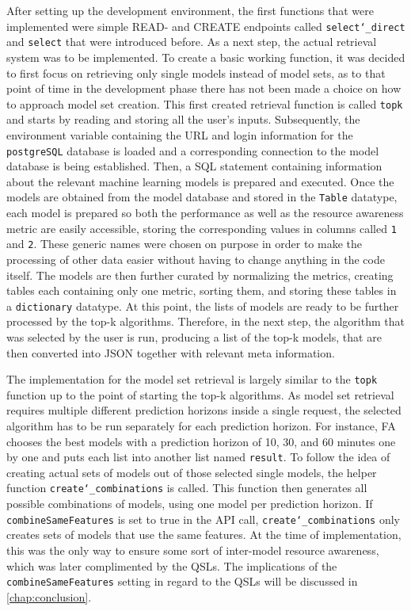 After setting up the development environment, the first functions that were implemented were simple READ- and CREATE endpoints called \texttt{select\char`_direct} and \texttt{select} that were introduced before. As a next step, the actual retrieval system was to be implemented. To create a basic working function, it was decided to first focus on retrieving only single models instead of model sets, as to that point of time in the development phase there has not been made a choice on how to approach model set creation. This first created retrieval function is called \texttt{topk} and starts by reading and storing all the user’s inputs. Subsequently, the environment variable containing the URL and login information for the \texttt{postgreSQL} database is loaded and a corresponding connection to the model database is being established. Then, a SQL statement containing information about the relevant machine learning models is prepared and executed. Once the models are obtained from the model database and stored in the \texttt{Table} datatype, each model is prepared so both the performance as well as the resource awareness metric are easily accessible, storing the corresponding values in columns called \texttt{1} and \texttt{2}. These generic names were chosen on purpose in order to make the processing of other data easier without having to change anything in the code itself. The models are then further curated by normalizing the metrics, creating tables each containing only one metric, sorting them, and storing these tables in a \texttt{dictionary} datatype. At this point, the lists of models are ready to be further processed by the top-k algorithms. Therefore, in the next step, the algorithm that was selected by the user is run, producing a list of the top-k models, that are then converted into JSON together with relevant meta information. 

The implementation for the model set retrieval is largely similar to the \texttt{topk} function up to the point of starting the top-k algorithms. As model set retrieval requires multiple different prediction horizons inside a single request, the selected algorithm has to be run separately for each prediction horizon. For instance, FA chooses the best models with a prediction horizon of 10, 30, and 60 minutes one by one and puts each list into another list named \texttt{result}. To follow the idea of creating actual sets of models out of those selected single models, the helper function \texttt{create\char`_combinations} is called. This function then generates all possible combinations of models, using one model per prediction horizon. If \texttt{combineSameFeatures} is set to true in the API call, \texttt{create\char`_combinations} only creates sets of models that use the same features. At the time of implementation, this was the only way to ensure some sort of inter-model resource awareness, which was later complimented by the QSLs. The implications of the \texttt{combineSameFeatures} setting in regard to the QSLs will be discussed in \autoref{chap:conclusion}.

